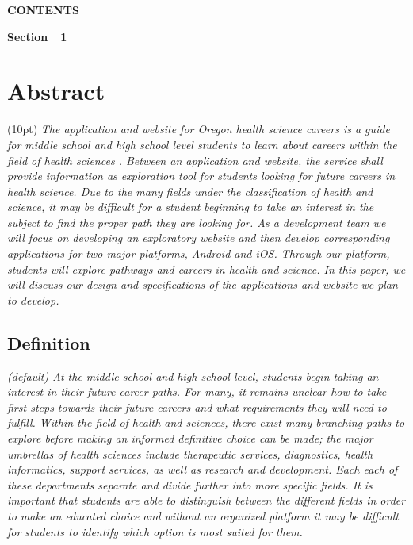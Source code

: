 \documentclass[letterpaper,10pt]{article}
\begin{document}
{

{\centering{}\bfseries\color{black}
CONTENTS
\par}


\bigskip

{\bfseries\color{black}
Section\ \ 1}

\setcounter{tocdepth}{9}
\renewcommand\contentsname{}
\tableofcontents

\bigskip

\clearpage\clearpage\setcounter{page}{1}\pagestyle{Convertii}
\section[Abstract]{\rmfamily\bfseries\color{black}
Abstract}
{\color{black}\normalsize(10pt)\emph{
The application and website for Oregon health science careers is a guide for middle school and high school level students to learn about careers within the field of health sciences . Between an application and website, the service shall provide information as exploration tool for students looking for future careers in health science. Due to the many fields under the classification of health and science, it may be difficult for a student beginning to take an interest in the subject to find the proper path they are looking for. As a development team we will focus on developing an exploratory website and then develop corresponding applications for two major platforms, Android and iOS. Through our platform, students will explore pathways and careers in health and science. In this paper, we will discuss our design and specifications of the applications and website we plan to develop.}}


\subsection[Definition]{\rmfamily\bfseries\color{black}
Definition}
{\itshape\color{black}\normalsize(default)
At the middle school and high school level, students begin taking an interest in their future career paths. For many, it remains unclear how to take first steps towards their future careers and what requirements they will need to fulfill. Within the field of health and sciences, there exist many branching paths to explore before making an informed definitive choice can be made; the major umbrellas of health sciences include therapeutic services, diagnostics, health informatics, support services, as well as research and development. Each each of these departments separate and divide further into more specific fields. It is important that students are able to distinguish between the different fields in order to make an educated choice and without an organized platform it may be difficult for students to identify which option is most suited for them.}


}
\end{document}
